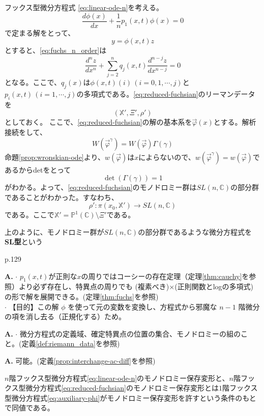 フックス型微分方程式
\eqref{eq:linear-ode-n}を考える。\\
\begin{equation}\label{eq:auxiliary-phi}
\frac{d\phi(x)}{dx}+\frac{1}{n}p_{1}(x,t)\phi(x)=0
\end{equation}
で定まる解をとって、
\[
y=\phi(x,t)z
\]
とすると、\eqref{eq:fuchs_n_order}は
\begin{equation}\label{eq:reduced-fuchsian}
\frac{d^{n}z}{dx^{n}}+\sum_{j=2}^{n} q_{j}(x,t)\frac{d^{n-j}z}{dx^{n-j}} = 0
\end{equation}
となる。ここで、$q_{j}(x)$は$\phi(x,t)(i)\,(i=0,1,\cdots,j)$と$p_{i}(x,t)\,(i=1,\cdots,j)$の多項式である。\eqref{eq:reduced-fuchsian}のリーマンデータを
\[
(\mathbb{X}',\Xi',\rho')
\]
としておく。
ここで、\eqref{eq:reduced-fuchsian}の解の基本系を$\vec{\varphi}(x)$とする。解析接続をして、
\[
W(\vec{\varphi}^{\gamma})=W(\vec{\varphi})\Gamma(\gamma)
\]
命題\ref{prop:wronskian-ode}より、$w(\vec{\varphi})$は$x$によらないので、$w(\vec{\varphi}^{\gamma})=w(\vec{\varphi})$であるからdetをとって
\[
\det(\Gamma(\gamma))=1
\]
がわかる。よって、\eqref{eq:reduced-fuchsian}のモノドロミー群は$SL(n,\mathbb{C})$の部分群であることがわかった。すなわち、
\[
\rho':\pi(x_{0},\mathbb{X}')\to SL(n,\mathbb{C})
\]
である。ここで$\mathbb{X}'=\mathbb{P}^{1}(\mathbb{C})\setminus \Xi'$である。

\begin{definition}
    上のように、モノドロミー群が$SL(n,\mathbb{C})$の部分群であるような微分方程式を\textbf{SL型}という
\end{definition}

p.129
\begin{Q}
\textbf{A.} $\cdot$ $p_1(x,t)$が正則な$x$の周りではコーシーの存在定理（定理\ref{thm:cauchy}を参照）より必ず存在し、特異点の周りでも (複素べき)$\times$(正則関数とlogの多項式) の形で解を展開できる。(定理\ref{thm:fuchs}を参照)\\
$\cdot$ 【目的】この解 $\phi$ を使って元の変数を変換し、方程式から邪魔な $n-1$ 階微分の項を消し去る（正規化する）ため。
\end{Q}

\begin{Q}[リーマンデータって何？]
\textbf{A.} $\cdot$ 微分方程式の定義域、確定特異点の位置の集合、モノドロミーの組のこと。(定義\ref{def:riemann_data}を参照)\\
\end{Q}

\begin{Q}[解析接続と微分は交換可能？]
\textbf{A.} 可能。(定義\ref{prop:interchange-ac-diff}を参照)\\
\end{Q}

\begin{proposition}
    $n$階フックス型微分方程式\eqref{eq:linear-ode-n}のモノドロミー保存変形と、$n$階フックス型微分方程式\eqref{eq:reduced-fuchsian}のモノドロミー保存変形とは$1$階フックス型微分方程式\eqref{eq:auxiliary-phi}がモノドロミー保存変形を許すという条件のもとで同値である。
\end{proposition}%

